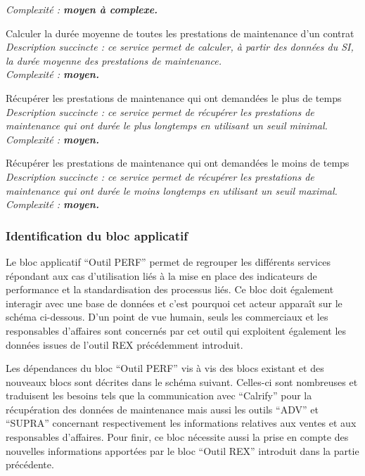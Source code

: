 \begin{description}
        \it{Complexité :} \bf{moyen} à \bf{complexe}.
    \item[\textbullet] Calculer la durée moyenne de toutes les prestations de maintenance d’un contrat \\
        \it{Description succincte :} ce service permet de calculer, à partir des données du SI, la durée moyenne des prestations de maintenance. \\
        \it{Complexité :} \bf{moyen}.
    \item[\textbullet] Récupérer les prestations de maintenance qui ont demandées le plus de temps \\
        \it{Description succincte :} ce service permet de récupérer les prestations de maintenance qui ont durée le plus longtemps en utilisant un seuil minimal. \\
        \it{Complexité :} \bf{moyen}.
    \item[\textbullet] Récupérer les prestations de maintenance qui ont demandées le moins de temps \\
        \it{Description succincte :} ce service permet de récupérer les prestations de maintenance qui ont durée le moins longtemps en utilisant un seuil maximal. \\
        \it{Complexité :} \bf{moyen}.
\end{description}

\subsubsection{Identification du bloc applicatif}

Le bloc applicatif “Outil PERF” permet de regrouper les différents services répondant aux cas d’utilisation liés à la mise en place des indicateurs de performance et la standardisation des processus liés. Ce bloc doit également interagir avec une base de données et c’est pourquoi cet acteur apparaît sur le schéma ci-dessous. D’un point de vue humain, seuls les commerciaux et les responsables d’affaires sont concernés par cet outil qui exploitent également les données issues de l’outil REX précédemment introduit.


Les dépendances du bloc “Outil PERF” vis à vis des blocs existant et des nouveaux blocs sont décrites dans le schéma suivant. Celles-ci sont nombreuses et traduisent les besoins tels que la communication avec “Calrify” pour la récupération des données de maintenance mais aussi les outils “ADV” et “SUPRA” concernant respectivement les informations relatives aux ventes et aux responsables d’affaires. Pour finir, ce bloc nécessite aussi la prise en compte des nouvelles informations apportées par le bloc “Outil REX” introduit dans la partie précédente.

